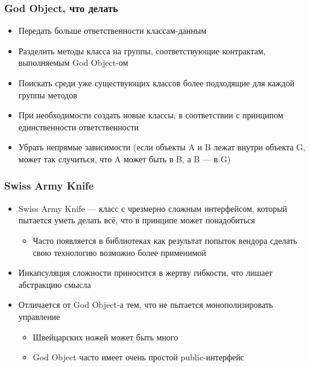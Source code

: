 \documentclass[xetex,mathserif,serif]{beamer}
\begin{document}
	\begin{frame}
		\frametitle{God Object, что делать}
		\begin{itemize}
			\item Передать больше ответственности классам-данным
			\item Разделить методы класса на группы, соответствующие контрактам, выполняемым God Object-ом
			\item Поискать среди уже существующих классов более подходящие для каждой группы методов
			\item При необходимости создать новые классы, в соответствии с принципом единственности ответственности
			\item Убрать непрямые зависимости (если объекты A и B лежат внутри объекта G, может так случиться, что A может быть в B, а B --- в G)
		\end{itemize}
	\end{frame}

	\begin{frame}
		\frametitle{Swiss Army Knife}
		\begin{itemize}
			\item Swiss Army Knife --- класс с чрезмерно сложным интерфейсом, который пытается уметь делать всё, что в принципе может понадобиться
			\begin{itemize}
				\item Часто появляется в библиотеках как результат попыток вендора сделать свою технологию возможно более применимой
			\end{itemize}
			\item Инкапсуляция сложности приносится в жертву гибкости, что лишает абстракцию смысла
			\item Отличается от God Object-а тем, что не пытается монополизировать управление
			\begin{itemize}
				\item Швейцарских ножей может быть много
				\item God Object часто имеет очень простой public-интерфейс
			\end{itemize}
		\end{itemize}
	\end{frame}
\end{document}
